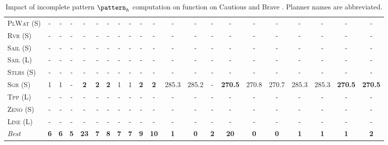 \begin{table}[tb]
{\begin{tabular}{|l||cccccccccc||cccccccccc||}
\textsc{PlWat} (S)&-&-&-&-&-&-&-&-&-&-&-&-&-&-&-&-&-&-&-&-\\
\textsc{Rvr} (S)&-&-&-&-&-&-&-&-&-&-&-&-&-&-&-&-&-&-&-&-\\
\textsc{Sail} (S)&-&-&-&-&-&-&-&-&-&-&-&-&-&-&-&-&-&-&-&-\\
\textsc{Sail} (L)&-&-&-&-&-&-&-&-&-&-&-&-&-&-&-&-&-&-&-&-\\
\textsc{Stlrs} (S)&-&-&-&-&-&-&-&-&-&-&-&-&-&-&-&-&-&-&-&-\\
\textsc{Sgr} (S)&1&1&-&\textbf{2}&\textbf{2}&\textbf{2}&1&1&\textbf{2}&\textbf{2}&285.3&285.2&-&\textbf{270.5}&270.8&270.7&285.3&285.3&\textbf{270.5}&\textbf{270.5}\\
\textsc{Tpp} (L)&-&-&-&-&-&-&-&-&-&-&-&-&-&-&-&-&-&-&-&-\\
\textsc{Zeno} (S)&-&-&-&-&-&-&-&-&-&-&-&-&-&-&-&-&-&-&-&-\\
\textsc{Line} (L)&-&-&-&-&-&-&-&-&-&-&-&-&-&-&-&-&-&-&-&-
\\\hline
\textit{Best}&\textbf{6}&\textbf{6}&\textbf{5}&\textbf{23}&\textbf{7}&\textbf{8}&\textbf{7}&\textbf{7}&\textbf{9}&\textbf{10}&\textbf{1}&\textbf{0}&\textbf{2}&\textbf{20}&\textbf{0}&\textbf{0}&\textbf{1}&\textbf{1}&\textbf{1}&\textbf{2}\\\hline

        \end{tabular}}
        \caption{Impact of incomplete pattern $\pattern_h$ computation on function on Cautious and Brave \pattyd. Planner names are abbreviated.}
        \label{tab:abl-patternh-incomplete}
        \end{table}
        